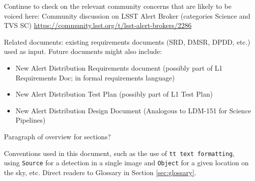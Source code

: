 Continue to check on the relevant community concerns that are likely to be voiced here:
Community discussion on LSST Alert Broker (categories Science and TVS SC)
\url{https://community.lsst.org/t/lsst-alert-brokers/2286}

Related documents: existing requirements documents (SRD, DMSR, DPDD, etc.) used as input. Future documents might also include:
\begin{itemize}
\item{New Alert Distribution Requirements document (possibly part of L1 Requirements Doc; in formal requirements language)}
\item{New Alert Distribution Test Plan (possibly part of L1 Test Plan)}
\item{New Alert Distribution Design Document (Analogous to LDM-151 for Science Pipelines)}
\end{itemize}

Paragraph of overview for sections?

Conventions used in this document, such as the use of {\tt tt text formatting}, using {\tt Source} for a detection in a single image and {\tt Object} for a given location on the sky, etc. Direct readers to Glossary in Section \ref{sec:glossary}.